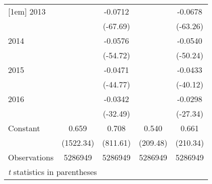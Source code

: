 \begin{table}[htbp]
\begin{tabular}{l*{4}{c}}
[1em]
2013                &            &     -0.0712&            &     -0.0678\\
                    &            &    (-67.69)&            &    (-63.26)\\
[1em]
2014                &            &     -0.0576&            &     -0.0540\\
                    &            &    (-54.72)&            &    (-50.24)\\
[1em]
2015                &            &     -0.0471&            &     -0.0433\\
                    &            &    (-44.77)&            &    (-40.12)\\
[1em]
2016                &            &     -0.0342&            &     -0.0298\\
                    &            &    (-32.49)&            &    (-27.34)\\
[1em]
Constant            &       0.659&       0.708&       0.540&       0.661\\
                    &   (1522.34)&    (811.61)&    (209.48)&    (210.34)\\
\hline
Observations        &     5286949&     5286949&     5286949&     5286949\\
\hline\hline
\multicolumn{5}{l}{\footnotesize \textit{t} statistics in parentheses}\\
\end{tabular}
\end{table}
